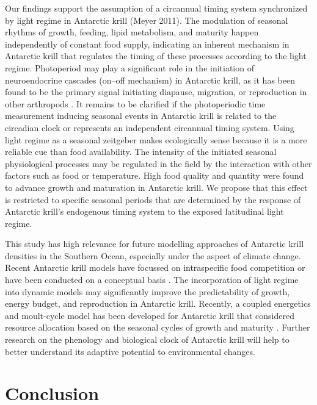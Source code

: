 Our findings support the assumption of a circannual timing system synchronized
by light regime in Antarctic krill (Meyer 2011). The modulation of seasonal
rhythms of growth, feeding, lipid metabolism, and maturity happen independently
of constant food supply, indicating an inherent mechanism in Antarctic krill
that regulates the timing of these processes according to the light regime.
Photoperiod may play a significant role in the initiation of neuroendocrine
cascades (on–off mechanism) in Antarctic krill, as it has been found to be the
primary signal initiating diapause, migration, or reproduction in other
arthropods \citep{bradshaw_evolution_2007}. It remains to be clarified if the
photoperiodic time measurement inducing seasonal events in Antarctic krill is
related to the circadian clock \citep{hut_latitudinal_2013,
meuti_functional_2015} or represents an independent circannual timing system.
Using light regime as a seasonal zeitgeber makes ecologically sense because it
is a more reliable cue than food availability. The intensity of the initiated
seasonal physiological processes may be regulated in the field by the
interaction with other factors such as food or temperature. High food quality
and quantity were found to advance growth \citep{ross_growth_2000,
atkinson_natural_2006} and maturation \citep{quetin_environmental_2001} in
Antarctic krill. We propose that this effect is restricted to specific seasonal
periods that are determined by the response of Antarctic krill’s endogenous
timing system to the exposed latitudinal light regime. 

This study has high relevance for future modelling approaches of Antarctic
krill densities in the Southern Ocean, especially under the aspect of climate
change. Recent Antarctic krill models have focussed on intraspecific food
competition \citep{ryabov_competition-induced_2017} or have been conducted on a
conceptual basis \citep{groeneveld_how_2015}. The incorporation of light regime
into dynamic models may significantly improve the predictability of growth,
energy budget, and reproduction in Antarctic krill. Recently, a coupled
energetics and moult-cycle model has been developed for Antarctic krill that
considered resource allocation based on the seasonal cycles of growth and
maturity \citep{constable_modelling_nodate}. Further research on the phenology
and biological clock of Antarctic krill will help to better understand its
adaptive potential to environmental changes. 

\section{Conclusion}

